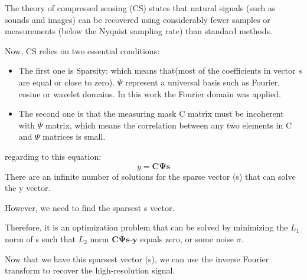 \documentclass[10pt,aspectratio=169,dvipsnames]{beamer} %
\newcommand{\bs}[1]{\boldsymbol{#1}}
\begin{document}
	\note
	{	
		\tiny
		The theory of compressed sensing (CS) states that natural signals (such as sounds and images) can be recovered using considerably fewer samples or measurements (below the Nyquist sampling rate) than standard methods.
		
		Now, CS relies on two essential conditions: 	
		\begin{itemize}
			\item The first one is Sparsity: which means that(\alert{most of the coefficients in vector \(s\) are equal or close to zero}).
			$\Psi$ represent a universal basis such as Fourier, cosine or wavelet domains.
			In this work the Fourier domain was applied. 
			\item The second one is that the measuring mask C matrix must be incoherent with \(\Psi\) matrix, which means the correlation between any two elements in C and $\Psi$ matrices is small.
		\end{itemize}		
		
		regarding to this equation: 
		\begin{equation}
			y = \bs{C}\bs{\Psi}\bs{s}
		\end{equation}
		There are an infinite number of solutions for the sparse vector (s) that can solve the y vector.
		
		However, we need to find the sparsest s vector.
		
		Therefore, it is an optimization problem that can be solved by minimizing the \(L_1\) norm of s such that \(L_2\) norm \(\bs{C}\bs{\Psi}\bs{s}\)-\(\bs{y}\) equals zero, or some noise $\sigma$.
		
		Now that we have this sparsest vector (s), we can use the inverse Fourier transform to recover the high-resolution signal.		
		
	}
\end{document}
